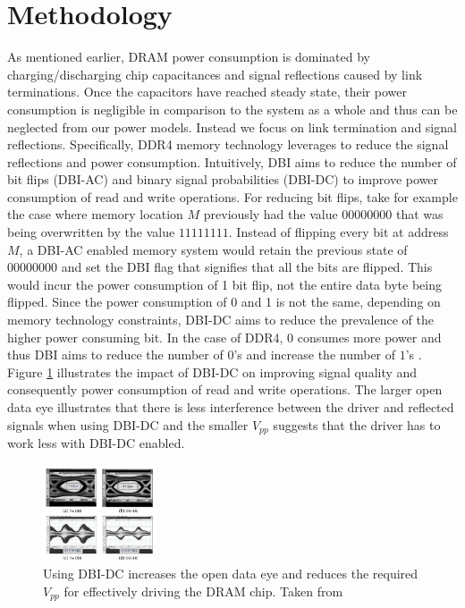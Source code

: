 \section{Methodology}
\label{sec-methodology}


As mentioned earlier, DRAM power consumption is dominated by
charging/discharging chip capacitances and signal reflections caused by link
terminations. Once the capacitors have reached steady state, their power
consumption is negligible in comparison to the system as a whole and thus can
be neglected from our power models. Instead we focus on link termination and
signal reflections. Specifically, DDR4 memory technology leverages  to
reduce the signal reflections and power consumption. Intuitively, DBI aims to
reduce the number of bit flips (DBI-AC) and binary signal probabilities
(DBI-DC) to improve power consumption of read and write operations. For
reducing bit flips, take for example the case where memory location $M$
previously had the value $00000000$ that was being overwritten by the value
$11111111$. Instead of flipping every bit at address $M$, a DBI-AC enabled
memory system would retain the previous state of $00000000$ and set the DBI
flag that signifies that all the bits are flipped.  This would incur the power
consumption of 1 bit flip, not the entire data byte being flipped.  Since the
power consumption of 0 and 1 is not the same, depending on memory technology
constraints, DBI-DC aims to reduce the prevalence of the higher power consuming
bit. In the case of DDR4, $0$ consumes more power and thus DBI aims to reduce
the number of $0$'s and increase the number of $1$'s \cite{low-power-dram}.
Figure \ref{fig:dbi-dc} illustrates the impact of DBI-DC on improving signal
quality and consequently power consumption of read and write operations. The
larger open data eye illustrates that there is less interference between the
driver and reflected signals when using DBI-DC and the smaller $V_{pp}$
suggests that the driver has to work less with DBI-DC enabled.

\begin{figure}[!htb]
  \centering
  \includegraphics[width=0.3\textwidth]{figs/dbi-dc}
  \caption{Using DBI-DC increases the open data eye and reduces the required
  $V_{pp}$ for effectively driving the DRAM chip. Taken from \cite{hollis}}
  \label{fig:dbi-dc}
\end{figure}

